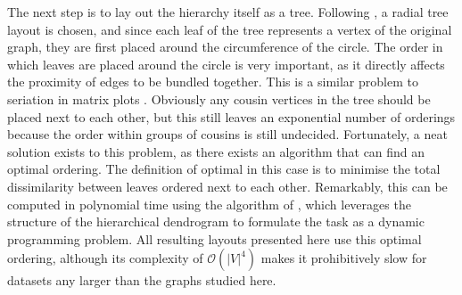 The next step is to lay out the hierarchy itself as a tree. Following \citet{Holten2006}, a radial tree layout is chosen, and since each leaf of the tree represents a vertex of the original graph, they are first placed around the circumference of the circle. The order in which leaves are placed around the circle is very important, as it directly affects the proximity of edges to be bundled together. This is a similar problem to seriation in matrix plots \citep{Liiv2010}.
Obviously any cousin vertices in the tree should be placed next to each other, but this still leaves an exponential number of orderings because the order within groups of cousins is still undecided.
Fortunately, a neat solution exists to this problem, as there exists an algorithm that can find an optimal ordering. The definition of optimal in this case is to minimise the total dissimilarity between leaves ordered next to each other.
Remarkably, this can be computed in polynomial time using the algorithm of \citet{Bar-Joseph2001}, which leverages the structure of the hierarchical dendrogram to formulate the task as a dynamic programming problem. All resulting layouts presented here use this optimal ordering, although its complexity of $\mathcal{O}(|V|^4)$ makes it prohibitively slow for datasets any larger than the graphs studied here.

